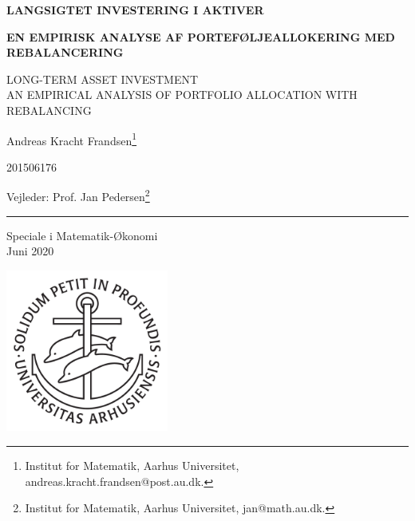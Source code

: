\begin{titlingpage}
\begin{center}
\vspace*{0.2cm}

\LARGE \textbf{LANGSIGTET INVESTERING I AKTIVER}

\vspace{3mm}

\renewcommand{\thefootnote}{\fnsymbol{footnote}}
\large \textbf{EN EMPIRISK ANALYSE AF PORTEFØLJEALLOKERING MED REBALANCERING}

\tiny LONG-TERM ASSET INVESTMENT\\ AN EMPIRICAL ANALYSIS OF PORTFOLIO ALLOCATION WITH REBALANCING

\vspace{2mm}

\Large Andreas Kracht Frandsen\footnote{Institut for Matematik, Aarhus Universitet, andreas.kracht.frandsen@post.au.dk.}

\Large 201506176

\Large Vejleder: Prof. Jan Pedersen\footnote{Institut for Matematik, Aarhus Universitet, jan@math.au.dk.}

\vspace{2mm}

\rule{1cm}{0.4pt}

\vspace{2mm}

Speciale i Matematik-Økonomi\\
Juni 2020

\vfill

\includegraphics[width=0.4\textwidth]{latex/ausegl_sort}

\vfill


\end{center}
\end{titlingpage}
